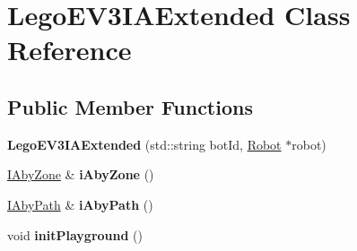 \hypertarget{classLegoEV3IAExtended}{}\section{Lego\+E\+V3\+I\+A\+Extended Class Reference}
\label{classLegoEV3IAExtended}
\subsection*{Public Member Functions}
\begin{DoxyCompactItemize}
\item 
\mbox{\label{classLegoEV3IAExtended_ae1544b400b9992d1d9d4096a6df6e91f}} 
{\bfseries Lego\+E\+V3\+I\+A\+Extended} (std\+::string bot\+Id, \hyperlink{classRobot}{Robot} $\ast$robot)
\item 
\mbox{\label{classLegoEV3IAExtended_a4f89a20e1bfd62bf0356a203eb816153}} 
\hyperlink{classIAbyZone}{I\+Aby\+Zone} \& {\bfseries i\+Aby\+Zone} ()
\item 
\mbox{\label{classLegoEV3IAExtended_a3902ad518400e1bfaff357e37370bb2e}} 
\hyperlink{classIAbyPath}{I\+Aby\+Path} \& {\bfseries i\+Aby\+Path} ()
\item 
\mbox{\label{classLegoEV3IAExtended_ab4574cea2cae491a0970e7b23455303b}} 
void {\bfseries init\+Playground} ()
\end{DoxyCompactItemize}
